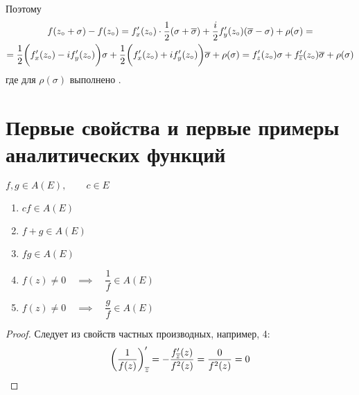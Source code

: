 Поэтому
\begin{multline}\lbl{form_diff:15}
	f(z_\circ + \sigma) - f(z_\circ) = f_x'(z_\circ) \cdot \frac12 (\sigma + \ol \sigma) + \frac i2 f_y'(z_\circ)(\ol \sigma - \sigma) + \rho(\sigma) = \\
	= \frac12 \bigg( f_x'(z_\circ) - if_y'(z_\circ) \bigg) \sigma + \frac12 \bigg( f_x'(z_\circ) + if_y'(z_\circ) \bigg) \ol \sigma + \rho(\sigma) = f_z'(z_\circ) \sigma + f_{\ol z}'(z_\circ) \ol \sigma + \rho(\sigma)
\end{multline}
где для $ \rho(\sigma) $ выполнено .

\section{Первые свойства и первые примеры аналитических функций}

\begin{properties}
	$ f, g \in A(E), \qquad c \in E $
	\begin{enumerate}
		\item $ cf \in A(E) $
		\item $ f + g \in A(E) $
		\item $ fg \in A(E) $
		\item $ f(z) \ne 0 \quad \implies \quad \dfrac1f \in A(E) $
		\item $ f(z) \ne 0 \quad \implies \quad \dfrac gf \in A(E) $
	\end{enumerate}
\end{properties}

\begin{proof}
	Следует из свойств частных производных, например, 4:
	$$ \bigg( \frac1{f(z)} \bigg)_{\overline z}' = -\frac{f_{\overline z}'(z)}{f^2(z)} = \frac 0{f^2(z)} = 0 $$
\end{proof}

